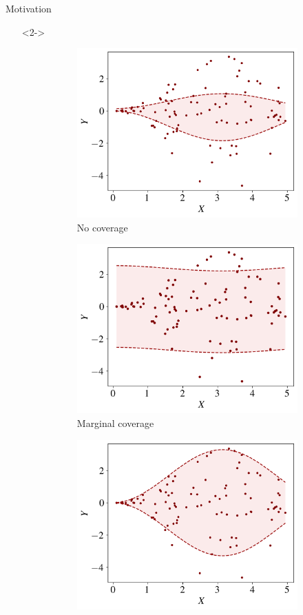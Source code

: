 \documentclass{beamer}
\begin{document}
\begin{frame}{Motivation}
\begin{itemize}
    \item[]<2-> 
    \begin{figure}[ht]
        \centering
        \begin{subfigure}[b]{0.3\textwidth}
            \centering
            \includegraphics[width=\textwidth, height=0.55\textwidth]{Figures/coverage/no-coverage.png}
            \caption{No coverage}
            \label{fig:coverage:no-cover}
        \end{subfigure}
        \hfill
        \begin{subfigure}[b]{0.3\textwidth}
            \centering
            \includegraphics[width=\textwidth, height=0.55\textwidth]{Figures/coverage/marginal-coverage.png}
            \caption{Marginal coverage}
            \label{fig:coverage:marg-cover}
        \end{subfigure}
        \hfill
        \begin{subfigure}[b]{0.3\textwidth}
            \centering
            \includegraphics[width=\textwidth, height=0.55\textwidth]{Figures/coverage/conditional-coverage.png}

\end{subfigure}
\end{figure}
\end{itemize}
\end{frame}
\end{document}
